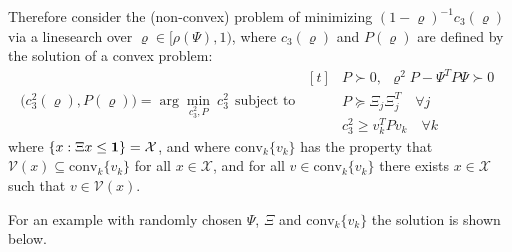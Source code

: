 \documentclass[11pt, oneside]{article}
\def\X{\mathcal{X}}
\def\V{\mathcal{V}}
\def\conv{\mathrm{conv}}
\begin{document}
Therefore consider the (non-convex) problem of minimizing $(1-\varrho)^{-1}c_3(\varrho)$ via a linesearch over $\varrho\in [\rho(\Psi),1)$, where $c_3(\varrho)$ and $P(\varrho)$ are defined by the solution of a convex problem:
\[
\bigl( c_3^2(\varrho), P(\varrho) \bigr) = \arg\min_{c_3^2,P}\ c_3^2 \ \ \text{subject to} \ \
\begin{aligned}[t]
& P \succ 0,  \ \ \varrho^2 P - \Psi^T P \Psi \succ 0\\
& P \succeq \Xi_j \Xi_j^T \quad \forall j \\
& c_3^2 \geq v_k^T P v_k \quad \forall k
\end{aligned}
\]
where 
$\{x: \Xi x \leq {\bf 1}\} = \X$, and where 
$\conv_k \{ v_k \}$ has the property that
$\V(x) \subseteq \conv_k \{ v_k\}$ for all $x\in \X$, and for all $v \in \conv_k \{ v_k\}$ there exists $x\in\X$ such that $v\in\V(x)$.

For an example with randomly chosen $\Psi$, $\Xi$ and $\conv_k\{ v_k\}$ the solution is shown below.
\end{document}
